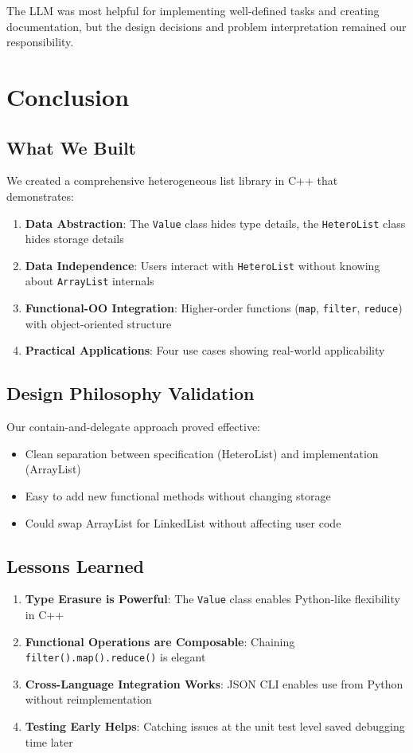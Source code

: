 \documentclass[11pt,a4paper]{article}
\begin{document}
The LLM was most helpful for implementing well-defined tasks and creating documentation, but the design decisions and problem interpretation remained our responsibility.

\section{Conclusion}

\subsection{What We Built}

We created a comprehensive heterogeneous list library in C++ that demonstrates:
\begin{enumerate}
    \item \textbf{Data Abstraction}: The \texttt{Value} class hides type details, the \texttt{HeteroList} class hides storage details
    \item \textbf{Data Independence}: Users interact with \texttt{HeteroList} without knowing about \texttt{ArrayList} internals
    \item \textbf{Functional-OO Integration}: Higher-order functions (\texttt{map}, \texttt{filter}, \texttt{reduce}) with object-oriented structure
    \item \textbf{Practical Applications}: Four use cases showing real-world applicability
\end{enumerate}

\subsection{Design Philosophy Validation}

Our contain-and-delegate approach proved effective:
\begin{itemize}
    \item Clean separation between specification (HeteroList) and implementation (ArrayList)
    \item Easy to add new functional methods without changing storage
    \item Could swap ArrayList for LinkedList without affecting user code
\end{itemize}

\subsection{Lessons Learned}

\begin{enumerate}
    \item \textbf{Type Erasure is Powerful}: The \texttt{Value} class enables Python-like flexibility in C++
    \item \textbf{Functional Operations are Composable}: Chaining \texttt{filter().map().reduce()} is elegant
    \item \textbf{Cross-Language Integration Works}: JSON CLI enables use from Python without reimplementation
    \item \textbf{Testing Early Helps}: Catching issues at the unit test level saved debugging time later
\end{enumerate}
\end{document}
